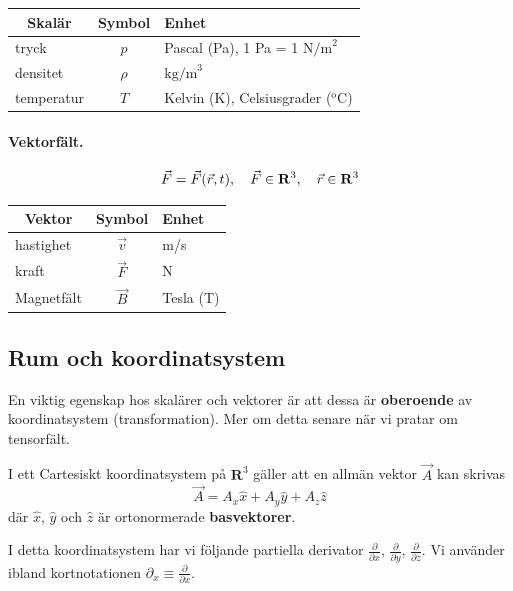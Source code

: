 \documentclass[%
oneside,                 %
final,                   %
10pt]{article}
\begin{document}
\begin{tabular}{lcl}
\hline
\multicolumn{1}{c}{ Skalär } & \multicolumn{1}{c}{ Symbol } & \multicolumn{1}{l}{ Enhet } \\
\hline
tryck      & $p$    & Pascal (Pa), 1 Pa = 1 $\mathrm{N/m}^2$              \\
densitet   & $\rho$ & $\mathrm{kg/m}^3$                                   \\
temperatur & $T$    & Kelvin (K), Celsiusgrader ($^\mathrm{o}\mathrm{C}$) \\
\hline
\end{tabular}


\noindent
\paragraph{Vektorfält.}
\begin{equation}
\vec{F} = \vec{F}(\vec{r},t), \quad \vec{F} \in \mathbf{R}^3,\quad \vec{r} \in \mathbf{R}^3 \\ 
\end{equation}



\begin{tabular}{lcl}
\hline
\multicolumn{1}{c}{ Vektor } & \multicolumn{1}{c}{ Symbol } & \multicolumn{1}{l}{ Enhet } \\
\hline
hastighet  & $\vec{v}$ & m/s       \\
kraft      & $\vec{F}$ & N         \\
Magnetfält & $\vec{B}$ & Tesla (T) \\
\hline
\end{tabular}


\noindent
\subsection*{Rum och koordinatsystem}

En viktig egenskap hos skalärer och vektorer är att dessa är \textbf{oberoende} av koordinatsystem (transformation). Mer om detta senare när vi pratar om tensorfält.

I ett Cartesiskt koordinatsystem på $\mathbf{R}^3$ gäller att en allmän vektor $\vec{A}$ kan skrivas
\begin{equation}
\vec{A} = A_x \hat{x} + A_y \hat{y} + A_z \hat{z}
\end{equation}
där $\hat{x}$, $\hat{y}$ och $\hat{z}$ är ortonormerade \textbf{basvektorer}.

I detta koordinatsystem har vi följande partiella derivator $\frac{\partial}{\partial x}$, $\frac{\partial}{\partial y}$, $\frac{\partial}{\partial z}$. Vi använder ibland kortnotationen $\partial_x \equiv \frac{\partial}{\partial x}$.
\end{document}
